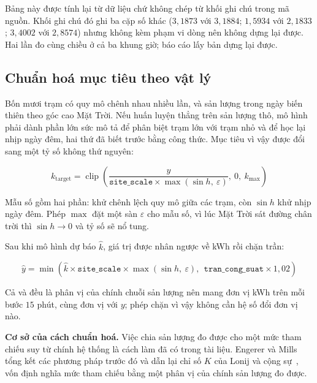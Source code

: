 Bảng này được tính lại từ dữ liệu chứ không chép từ khối ghi chú trong mã nguồn. Khối ghi chú
đó ghi ba cặp số khác ($3{,}1873$ với $3{,}1884$; $1{,}5934$ với $2{,}1833$; $3{,}4002$ với
$2{,}8574$) nhưng không kèm phạm vi dòng nên không dựng lại được. Hai lần đo cùng chiều ở cả ba
khung giờ; báo cáo lấy bản dựng lại được.

\FloatBarrier
\subsection{Chuẩn hoá mục tiêu theo vật lý}

Bốn mươi trạm có quy mô chênh nhau nhiều lần, và sản lượng trong ngày biến thiên theo góc cao
Mặt Trời. Nếu huấn luyện thẳng trên sản lượng thô, mô hình phải dành phần lớn sức mô tả để
phân biệt trạm lớn với trạm nhỏ và để học lại nhịp ngày đêm, hai thứ đã biết trước bằng
công thức. Mục tiêu vì vậy được đổi sang một tỷ số không thứ nguyên:

\begin{equation}
k_{\text{target}} = \operatorname{clip}\!\left(
\frac{y}{\texttt{site\_scale} \times \max(\sin h,\ \varepsilon)},\ 0,\ k_{\max}\right)
\end{equation}

Mẫu số gồm hai phần:  khử chênh lệch quy mô giữa các trạm, còn $\sin h$ khử
nhịp ngày đêm. Phép $\max$ đặt một sàn $\varepsilon$ cho mẫu số, vì lúc Mặt Trời sát đường
chân trời thì $\sin h \to 0$ và tỷ số sẽ nổ tung.

Sau khi mô hình dự báo $\hat{k}$, giá trị được nhân ngược về kWh rồi chặn trần:

\begin{equation}
\hat{y} = \min\!\left(
\hat{k} \times \texttt{site\_scale} \times \max(\sin h,\ \varepsilon),\ \
\texttt{tran\_cong\_suat} \times 1{,}02\right)
\end{equation}

Cả  và  đều là phân vị của chính chuỗi sản lượng nên
mang đơn vị kWh trên mỗi bước $15$ phút, cùng đơn vị với $y$; phép chặn vì vậy không cần hệ số
đổi đơn vị nào.

\textbf{Cơ sở của cách chuẩn hoá.} Việc chia sản lượng đo được cho một mức tham chiếu suy từ
chính hệ thống là cách làm đã có trong tài liệu. Engerer và Mills~\cite{engerer2014kpv} tổng
kết các phương pháp trước đó và dẫn lại chỉ số $K$ của Lonij và cộng sự~\cite{lonij2012tucson},
vốn định nghĩa mức tham chiếu bằng một phân vị của chính sản lượng đo được.

